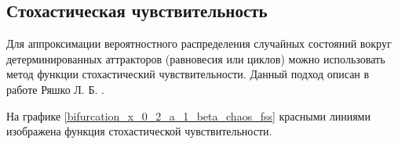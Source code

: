 \subsection{Стохастическая чувствительность}

    Для аппроксимации вероятностного распределения случайных состояний вокруг детерминированных аттракторов (равновесия или циклов) можно использовать метод функции стохастический чувствительности. Данный подход описан в работе Ряшко Л. Б. \cite{Ryashko}.

    На графике \ref{bifurcation_x_0_2_a_1_beta_chaos_fss} красными линиями изображена функция стохастической чувствительности. 

    \begin{figure}
        \centering

            

\end{figure}

